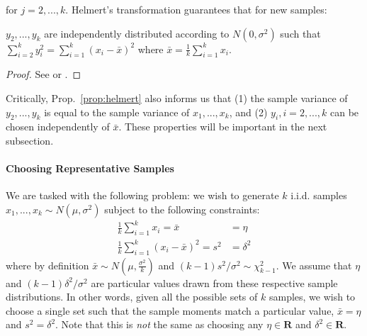 for $j = 2, ..., k$. Helmert's transformation guarantees that for new samples:
\begin{prop}
    $y_2, ..., y_k$ are independently distributed according to $N(0, \sigma^2)$ such that $\sum_{i=2}^{k} y_i^2 = \sum_{i=1}^{k}(x_i - \bar{x})^2$ where $\bar{x} = \frac{1}{k}\sum_{i=1}^{k} x_i$.
\label{prop:helmert}
\end{prop}
\begin{proof} See \cite{helmert1875berechnung} or \cite{kruskal1946helmert}.
\end{proof}

Critically, Prop.~\ref{prop:helmert} also informs us that (1) the sample variance of $y_2, ..., y_k$ is equal to the sample variance of $x_1, ..., x_k$, and (2) $y_i, i=2,...,k$ can be chosen independently of $\bar{x}$. These properties will be important in the next subsection.

\paragraph{Choosing Representative Samples}



We are tasked with the following problem: we wish to generate $k$ i.i.d. samples $x_1, ..., x_k \sim N(\mu, \sigma^2)$ subject to the following constraints:
\begin{align}
    \frac{1}{k}\sum_{i=1}^{k} x_i = \bar{x} &= \eta \label{eqn:constraint1}\\
    \frac{1}{k}\sum_{i=1}^{k}(x_i - \bar{x})^2 = s^2 &= \delta^2 \label{eqn:constraint2}
\end{align}
where by definition $\bar{x} \sim N(\mu, \frac{\sigma^2}{k})$ and $(k-1)s^2 / \sigma^2 \sim \chi^2_{k-1}$. We assume that $\eta$ and $(k-1)\delta^2/\sigma^2$ are particular values drawn from these respective sample distributions. In other words, given all the possible sets of $k$ samples, we wish to choose a single set such that the sample moments match a particular value, $\bar{x} = \eta$ and $s^2 = \delta^2$. Note that this is \textit{not} the same as choosing any $\eta \in \mathbf{R}$ and $\delta^2 \in \mathbf{R}$.

